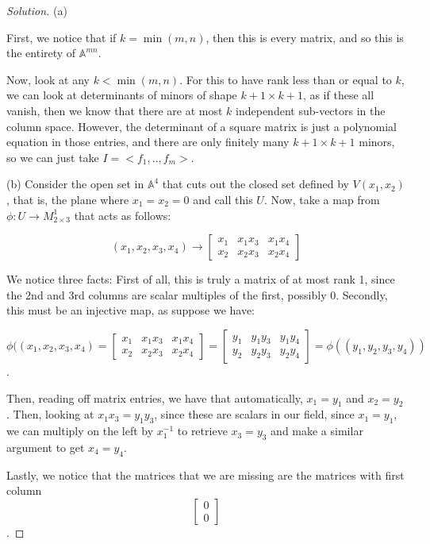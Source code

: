 \documentclass[10pt]{article}
\begin{document}
\begin{proof}[Solution]

(a)

First, we notice that if $k = \min(m,n)$, then this is every matrix, and so this is the entirety of $\mathbb{A}^{mn}$.

Now, look at any $k < \min(m,n)$. For this to have rank less than or equal to $k$, we can look at determinants of minors of shape $k+1 \times k+1$, as if these all vanish, then we know that there are at most $k$ independent sub-vectors in the column space. However, the determinant of a square matrix is just a polynomial equation in those entries, and there are only finitely many $k+1 \times k+1$ minors, so we can just take $I = <f_1,..,f_m>$.

(b)
Consider the open set in $\mathbb{A}^4$ that cuts out the closed set defined by $V(x_1,x_2)$, that is, the plane where $x_1 = x_2 = 0$ and call this $U$. Now, take a map from $\phi: U \to M_{2\times3}^1$ that acts as follows:

$$ (x_1,x_2,x_3,x_4) \to \begin{bmatrix} x_1 & x_1x_3  & x_1x_4 \\ x_2 & x_2x_3 & x_2x_4 \end{bmatrix} $$

We notice three facts: First of all, this is truly a matrix of at most rank 1, since the 2nd and 3rd columns are scalar multiples of the first, possibly 0. Secondly, this must be an injective map, as suppose we have:

$$ \phi((x_1,x_2,x_3,x_4) = \begin{bmatrix} x_1 & x_1x_3  & x_1x_4 \\ x_2 & x_2x_3& x_2x_4 \end{bmatrix} = \begin{bmatrix} y_1 & y_1y_3  & y_1y_4 \\ y_2 & y_2y_3 & y_2y_4 \end{bmatrix} = \phi((y_1,y_2,y_3,y_4)) $$.

Then, reading off matrix entries, we have that automatically, $x_1 = y_1$ and $x_2 = y_2$. Then, looking at $x_1x_3 = y_1 y_3$, since these are scalars in our field, since $x_1 = y_1$, we can multiply on the left by $x_1^{-1}$ to retrieve $x_3 = y_3$ and make a similar argument to get $x_4 = y_4$.

Lastly, we notice that the matrices that we are missing are the matrices with first column $$\begin{bmatrix} 0 \\ 0 \end{bmatrix}$$.


\end{proof}
\end{document}
